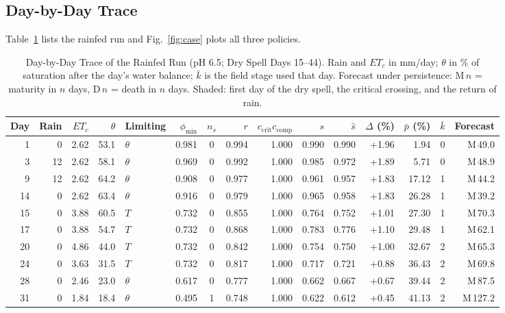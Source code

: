 \documentclass[conference]{IEEEtran}
\begin{document}
\subsection{Day-by-Day Trace}
Table~\ref{tab:trace} lists the rainfed run and Fig.~\ref{fig:case} plots all three policies.

\begin{table}[t]
\centering
\caption{Day-by-Day Trace of the Rainfed Run (pH 6.5; Dry Spell Days 15--44).
Rain and $ET_c$ in mm/day; $\theta$ in \% of saturation after the day's water balance; $\bar k$ is the
field stage used that day. Forecast under persistence: M\,$n$ = maturity in $n$ days, D\,$n$ =
death in $n$ days. Shaded: first day of the dry spell, the critical crossing, and the return of rain.}
\label{tab:trace}
\scriptsize
\setlength{\tabcolsep}{3.6pt}
\begin{tabular}{@{}r|rrr|lrcrr|rrr|rrr@{}}
\toprule
Day & Rain & $ET_c$ & $\theta$ & Limiting & $\phi_{\min}$ & $n_s$ & $r$ &
$c_{\mathrm{crit}}c_{\mathrm{comp}}$ & $s$ & $\hat s$ & $\Delta$ (\%) & $\bar p$ (\%) & $\bar k$ & Forecast \\
\midrule
1 & 0 & 2.62 & 53.1 & $\theta$ & 0.981 & 0 & 0.994 & 1.000 & 0.990 & 0.990 & +1.96 & 1.94 & 0 & M\,49.0 \\
3 & 12 & 2.62 & 58.1 & $\theta$ & 0.969 & 0 & 0.992 & 1.000 & 0.985 & 0.972 & +1.89 & 5.71 & 0 & M\,48.9 \\
9 & 12 & 2.62 & 64.2 & $\theta$ & 0.908 & 0 & 0.977 & 1.000 & 0.961 & 0.957 & +1.83 & 17.12 & 1 & M\,44.2 \\
14 & 0 & 2.62 & 63.4 & $\theta$ & 0.916 & 0 & 0.979 & 1.000 & 0.965 & 0.958 & +1.83 & 26.28 & 1 & M\,39.2 \\
\rowcolor{cEvent!15}15 & 0 & 3.88 & 60.5 & $T$ & 0.732 & 0 & 0.855 & 1.000 & 0.764 & 0.752 & +1.01 & 27.30 & 1 & M\,70.3 \\
17 & 0 & 3.88 & 54.7 & $T$ & 0.732 & 0 & 0.868 & 1.000 & 0.783 & 0.776 & +1.10 & 29.48 & 1 & M\,62.1 \\
20 & 0 & 4.86 & 44.0 & $T$ & 0.732 & 0 & 0.842 & 1.000 & 0.754 & 0.750 & +1.00 & 32.67 & 2 & M\,65.3 \\
24 & 0 & 3.63 & 31.5 & $T$ & 0.732 & 0 & 0.817 & 1.000 & 0.717 & 0.721 & +0.88 & 36.43 & 2 & M\,69.8 \\
28 & 0 & 2.46 & 23.0 & $\theta$ & 0.617 & 0 & 0.777 & 1.000 & 0.662 & 0.667 & +0.67 & 39.44 & 2 & M\,87.5 \\
31 & 0 & 1.84 & 18.4 & $\theta$ & 0.495 & 1 & 0.748 & 1.000 & 0.622 & 0.612 & +0.45 & 41.13 & 2 & M\,127.2 \\

\end{tabular}
\end{table}
\end{document}
